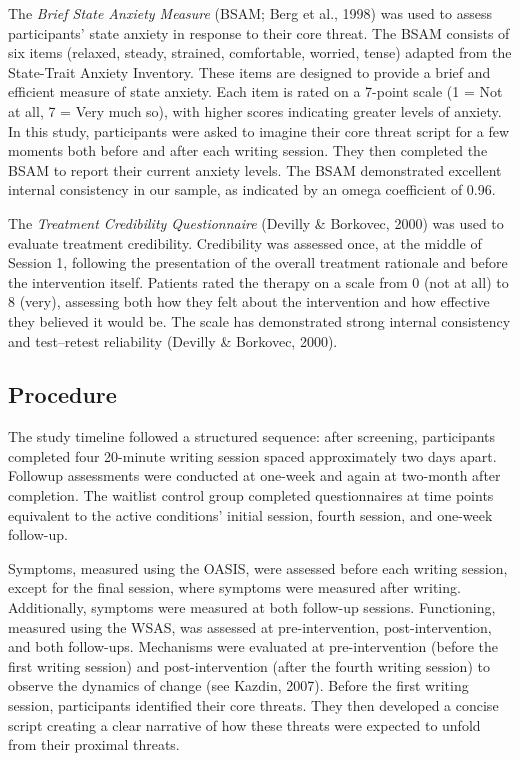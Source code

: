 \documentclass[
  man,floatsintext]{apa7}
\begin{document}
The \emph{Brief State Anxiety Measure} (BSAM; Berg et al., 1998) was used to assess participants' state anxiety in response to their core threat.
The BSAM consists of six items (relaxed, steady, strained, comfortable, worried, tense) adapted from the State-Trait Anxiety Inventory.
These items are designed to provide a brief and efficient measure of state anxiety.
Each item is rated on a 7-point scale (1 = Not at all, 7 = Very much so), with higher scores indicating greater levels of anxiety.
In this study, participants were asked to imagine their core threat script for a few moments both before and after each writing session.
They then completed the BSAM to report their current anxiety levels.
The BSAM demonstrated excellent internal consistency in our sample, as indicated by an omega coefficient of 0.96.

The \emph{Treatment Credibility Questionnaire} (Devilly \& Borkovec, 2000) was used to evaluate treatment credibility.
Credibility was assessed once, at the middle of Session 1, following the presentation of the overall treatment rationale and before the intervention itself.
Patients rated the therapy on a scale from 0 (not at all) to 8 (very), assessing both how they felt about the intervention and how effective they believed it would be.
The scale has demonstrated strong internal consistency and test--retest reliability (Devilly \& Borkovec, 2000).

\subsection{Procedure}\label{procedure}

The study timeline followed a structured sequence: after screening, participants completed four 20-minute writing session spaced approximately two days apart.
Followup assessments were conducted at one-week and again at two-month after completion.
The waitlist control group completed questionnaires at time points equivalent to the active conditions' initial session, fourth session, and one-week follow-up.

Symptoms, measured using the OASIS, were assessed before each writing session, except for the final session, where symptoms were measured after writing.
Additionally, symptoms were measured at both follow-up sessions.
Functioning, measured using the WSAS, was assessed at pre-intervention, post-intervention, and both follow-ups.
Mechanisms were evaluated at pre-intervention (before the first writing session) and post-intervention (after the fourth writing session) to observe the dynamics of change (see Kazdin, 2007).
Before the first writing session, participants identified their core threats.
They then developed a concise script creating a clear narrative of how these threats were expected to unfold from their proximal threats.
\end{document}
